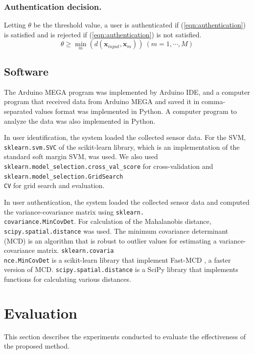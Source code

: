 \documentclass[sigconf,authordraft]{acmart}
\begin{document}
\subsubsection{Authentication decision.}
Letting $\theta$ be the threshold value, a user is authenticated if (\ref{eqn:authentication}) is satisfied and is rejected if (\ref{eqn:authentication}) is not satisfied.
\begin{equation}
\label{eqn:authentication}
  \theta \geq \min_m(d(\bm{x}_{input},\bm{x}_m))~(m=1,\cdots,M)
\end{equation}


\subsection{Software}
The Arduino MEGA program was implemented by Arduino IDE, and a computer program that received data from Arduino MEGA and saved it in comma-separated values format was implemented in Python. A computer program to analyze the data was also implemented in Python.\par

In user identification, the system loaded the collected sensor data. For the SVM, \texttt{sklearn.svm.SVC} of the scikit-learn \cite{scikit-learn} library, which is an implementation of the standard soft margin SVM, was used. We also used \texttt{sklearn.model\_selection.cross\_val\_score} for cross-validation and \texttt{sklearn.model\_selection.GridSearch}\\\texttt{CV} for grid search and evaluation.\par

In user authentication, the system loaded the collected sensor data and computed the variance-covariance matrix using \texttt{sklearn.}\\\texttt{covariance.MinCovDet}. For calculation of the Mahalanobis distance, \texttt{scipy.spatial.distance} was used. The minimum covariance determinant (MCD) is an algorithm that is robust to outlier values for estimating a variance-covariance matrix. \texttt{sklearn.covaria}\\\texttt{nce.MinCovDet} is a scikit-learn library that implement Fast-MCD \cite{fast_mcd}, a faster version of MCD. \texttt{scipy.spatial.distance} is a SciPy \cite{scipy} library that implements functions for calculating various distances.


\section{Evaluation}
\label{sec:evaluation}
This section describes the experiments conducted to evaluate the effectiveness of the proposed method.
\end{document}
